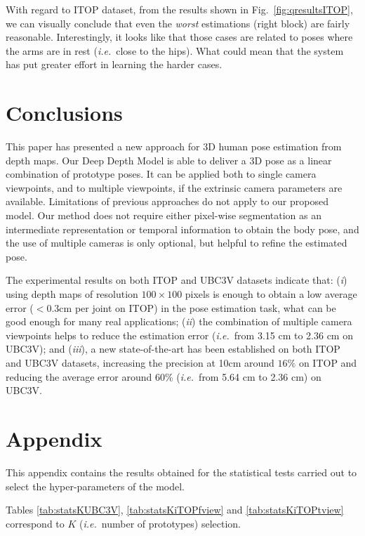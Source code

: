 \documentclass[review,12pt,3p]{elsarticle}
\def \ie{\textit{i.e.}}
\begin{document}
With regard to ITOP dataset, from the results shown in Fig.~\ref{fig:qresultsITOP}, we can visually conclude that even the \textit{worst} estimations (right block) are fairly reasonable. Interestingly, it looks like that those cases are related to poses where the arms are in rest (\ie~close to the hips). What could mean that the system has put greater effort in learning the harder cases.


\section{Conclusions}\label{sec:conclus}
This paper has presented a new approach for 3D human pose estimation from depth maps. Our Deep Depth Model is able to deliver a 3D pose as a linear combination of prototype poses. It can be applied both to single camera viewpoints, and to multiple viewpoints, if the extrinsic camera parameters are available.
Limitations of previous approaches do not apply to our proposed model. Our method does not require either pixel-wise segmentation as an intermediate representation or temporal information to obtain the body pose, and the use of multiple cameras is only optional, but helpful to refine the estimated pose.

The experimental results on both ITOP and UBC3V datasets indicate that: 
(\textit{i}) using depth maps of resolution $100\times100$ pixels is enough to obtain a low average error ($<0.3$cm per joint on ITOP) in the pose estimation task, what can be good enough for many real applications;  
(\textit{ii}) the combination of multiple camera viewpoints helps to reduce the estimation error (\ie~from 3.15 cm to 2.36 cm on UBC3V); and (\textit{iii}), a new state-of-the-art has been established on both ITOP and UBC3V datasets, increasing the precision at 10cm around $16\%$ on ITOP and reducing the average error around $60\%$ (\ie~from 5.64 cm to 2.36 cm) on UBC3V.

\section*{Appendix} \label{sec:appendix}
This appendix contains the results obtained for the statistical tests carried out to select the hyper-parameters of the model.

Tables \ref{tab:statsKUBC3V}, \ref{tab:statsKiTOPfview} and \ref{tab:statsKiTOPtview} correspond to $K$ (\ie~number of prototypes) selection.
\end{document}
